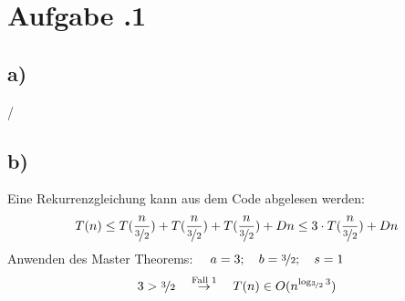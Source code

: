 \newpage
\section*{Aufgabe \bn.1}
\subsection*{a)}
/
\subsection*{b)}
Eine Rekurrenzgleichung kann aus dem Code abgelesen werden:
\begin{align*}
  T(n) \le T(\frac{ n }{ \nicefrac{ 3 }{ 2 } } ) + T(\frac{ n }{ \nicefrac{ 3 }{ 2 } } ) + T(\frac{ n }{ \nicefrac{ 3 }{ 2 } } ) + Dn \le 3\cdot T(\frac{ n }{ \nicefrac{ 3 }{ 2 } } )+ Dn
\end{align*}
Anwenden des Master Theorems: $\quad a=3;\quad b=\nicefrac{3}{2}; \quad s=1 $
\begin{align*}
  3>\nicefrac{3}{2} \quad\overset{\text{Fall 1}}{\rightarrow }\quad T(n)\in O(n ^{ \log_{\nicefrac{3}{2}}3 } )
\end{align*}